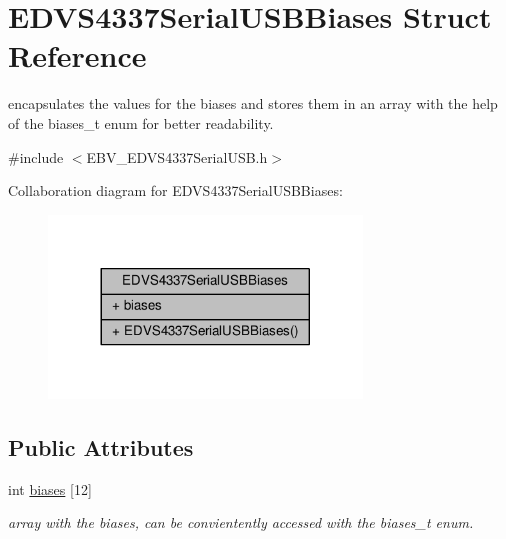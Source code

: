 \hypertarget{struct_e_d_v_s4337_serial_u_s_b_biases}{}\section{E\+D\+V\+S4337\+Serial\+U\+S\+B\+Biases Struct Reference}
\label{struct_e_d_v_s4337_serial_u_s_b_biases}


encapsulates the values for the biases and stores them in an array with the help of the biases\+\_\+t enum for better readability.  




{\ttfamily \#include $<$E\+B\+V\+\_\+\+E\+D\+V\+S4337\+Serial\+U\+S\+B.\+h$>$}



Collaboration diagram for E\+D\+V\+S4337\+Serial\+U\+S\+B\+Biases\+:
\nopagebreak
\begin{figure}[H]
\begin{center}
\leavevmode
\includegraphics[width=236pt]{struct_e_d_v_s4337_serial_u_s_b_biases__coll__graph}
\end{center}
\end{figure}
\subsection*{Public Attributes}
\begin{DoxyCompactItemize}
\item 
\hypertarget{struct_e_d_v_s4337_serial_u_s_b_biases_a35f86bae016e35fcd7859e0276cab60b}{}int \hyperlink{struct_e_d_v_s4337_serial_u_s_b_biases_a35f86bae016e35fcd7859e0276cab60b}{biases} \mbox{[}12\mbox{]}\label{struct_e_d_v_s4337_serial_u_s_b_biases_a35f86bae016e35fcd7859e0276cab60b}

\begin{DoxyCompactList}\small\item\em array with the biases, can be convientently accessed with the biases\+\_\+t enum. \end{DoxyCompactList}\end{DoxyCompactItemize}


